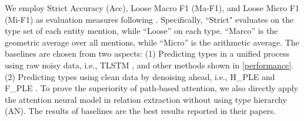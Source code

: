 \documentclass[letterpaper]{article} %
\begin{document}
We employ Strict Accuracy (Acc), Loose Macro F1 (Ma-F1), and Loose Micro F1 (Mi-F1) as evaluation measures following \cite{Shimaoka2016Neural}. Specifically, ``Strict" evaluates on the type set of each entity mention, while ``Loose'' on each type. ``Marco'' is the geometric average over all mentions, while ``Micro'' is the arithmetic average. %
The baselines are chosen from two aspects: (1) Predicting types in a unified process using raw noisy data, i.e., TLSTM \cite{Shimaoka2016Neural}, and other methods shown in \tablename \ref{performance}. 
(2) Predicting types using clean data by denoising ahead, i.e., H\_PLE and F\_PLE \cite{Ren2016Label}. To prove the superiority of path-based attention, we also directly apply the attention neural model in relation extraction \cite{Lin2016Neural} without using type hierarchy (AN). %
The results of baselines are the best results reported in their papers. %
\end{document}
